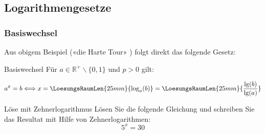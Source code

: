 \newpage



\subsection{Logarithmengesetze}
\subsubsection{Basiswechsel}
Aus obigem Beispiel («die Harte Tour» ) folgt direkt das folgende Gesetz:

\begin{gesetz}{Basiswechsel}{}
  Für $a\in\mathbb{R}^{+}\backslash\{0,1\}$ und $p>0$ gilt:

  $$a^x=b \Longleftrightarrow x= \LoesungsRaumLen{25mm}{\log_a(b)} = \LoesungsRaumLen{25mm}{\frac{\lg(b)}{\lg(a)}}$$
\end{gesetz}





\begin{beispiel}{Löse mit Zehnerlogarithmus}{}
  Lösen Sie die folgende Gleichung und schreiben Sie das Resultat mit
  Hilfe von Zehnerlogarithmen:
  $$5^x = 30$$
\end{beispiel}
\newpage

